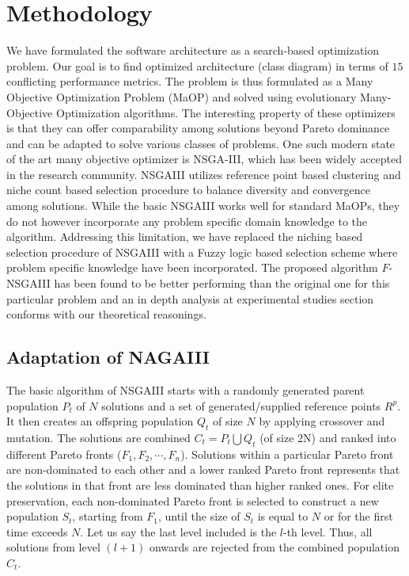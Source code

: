 \documentclass[letterpaper, 10 pt, conference]{ieeeconf}  %
\begin{document}
\section{Methodology}
\label{sec:methodologies}

We have formulated the software architecture as a search-based optimization problem. Our goal is to find optimized architecture (class diagram) in terms of $15$ conflicting performance metrics. The problem is thus formulated as a Many Objective Optimization Problem (MaOP) and solved using evolutionary Many-Objective Optimization algorithms. The interesting property of these optimizers is that they can offer comparability among solutions beyond Pareto dominance and can be adapted to solve various classes of problems. One such modern state of the art many objective optimizer is NSGA-III, which has been widely accepted in the research community. NSGAIII utilizes reference point based clustering and niche count based selection procedure to balance diversity and convergence among solutions. While the basic NSGAIII works well for standard MaOPs, they do not however incorporate any problem specific domain knowledge to the algorithm. Addressing this limitation, we have replaced the niching based selection procedure of NSGAIII with a Fuzzy logic based selection scheme where problem specific knowledge have been incorporated. The proposed algorithm $F$-NSGAIII has been found to be better performing than the original one for this particular problem and an in depth analysis at experimental studies section conforms with our theoretical reasonings.



\subsection{Adaptation of NAGAIII}
\label{subsec:pseudocode}

The basic algorithm of NSGAIII starts with a randomly generated parent population $P_t$ of $N$ solutions and a set of generated/supplied reference points $R^p$. It then creates an offspring population $Q_t$ of size $N$ by applying crossover and mutation. The solutions are combined $C_t = P_t \bigcup Q_t$ (of size 2N) and ranked into different Pareto fronts ($F_1, F_2, \cdots, F_n$). Solutions within a particular Pareto front are non-dominated to each other and a lower ranked Pareto front represents that the solutions in that front are less dominated than higher ranked ones. For elite preservation, each non-dominated Pareto front is selected to construct a new population $S_t$, starting from $F_1$, until the size of $S_t$ is equal to $N$ or for the first time exceeds $N$. Let us say the last level included is the $l$-th level. Thus, all solutions from level $(l + 1)$ onwards are rejected from the combined population $C_t$. 
\end{document}
